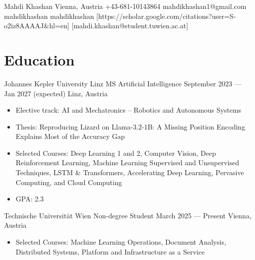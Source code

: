 \documentclass[letterpaper]{resume_config}
\begin{document}
\Header
    {Mahdi Khashan} %
    {Vienna, Austria} %
    {+43-681-10143864} %
    {mahdikhashan1@gmail.com} %
    {mahdikhashan} %
    {mahdikhashan} %
    [https://scholar.google.com/citations?user=S-o2iz8AAAAJ&hl=en] %
    [mahdi.khashan@student.tuwien.ac.at] %


\section{Education}

\EducationExperience
    {Johannes Kepler University Linz} %
    {MS Artificial Intelligence} %
    {September 2023 --- Jan 2027 (expected)} %
    {Linz, Austria} %
\begin{itemize}[noitemsep, topsep=0pt, leftmargin=1em]
    \item Elective track: AI and Mechatronics -- Robotics and Autonomous Systems
    \item Thesis: Reproducing Lizard on Llama-3.2-1B: A Missing Position Encoding Explains Most of the Accuracy Gap
    \item Selected Courses: Deep Learning 1 and 2, Computer Vision, Deep Reinforcement Learning, Machine Learning Supervised and Unsupervised Techniques, LSTM \& Transformers, Accelerating Deep Learning, Pervasive Computing, and Cloud Computing
    \item GPA: 2.3
\end{itemize}
\vspace{12pt}

\EducationExperience
    {Technische Universität Wien} %
    {Non-degree Student} %
    {March 2025 --- Present} %
    {Vienna, Austria} %
\begin{itemize}[noitemsep, topsep=0pt, leftmargin=1em]
    \item Selected Courses: Machine Learning Operations, Document Analysis, Distributed Systems, Platform and Infrastructure as a Service
\end{itemize}
\vspace{12pt}
\end{document}
